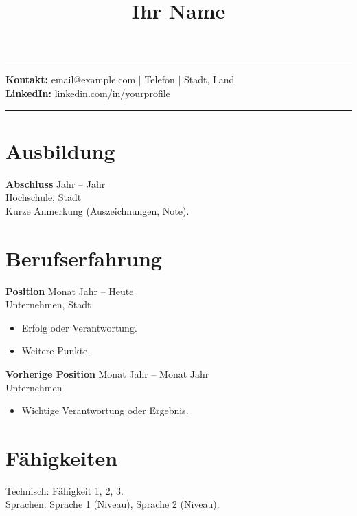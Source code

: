 \documentclass[11pt,a4paper]{article}
\title{\vspace{-1.2cm}\textbf{Ihr Name}}
\author{}
\date{}
\begin{document}
\maketitle
\vspace{-0.8cm}
\begin{flushright}\rule{2.2cm}{2.8cm}\end{flushright}

\textbf{Kontakt:} email@example.com \quad | \quad Telefon \quad | \quad Stadt, Land \\
\textbf{LinkedIn:} linkedin.com/in/yourprofile

\vspace{0.4cm}
\noindent\rule{\textwidth}{0.4pt}

\section*{Ausbildung}
\textbf{Abschluss} \hfill Jahr -- Jahr \\
Hochschule, Stadt \\
Kurze Anmerkung (Auszeichnungen, Note).

\section*{Berufserfahrung}
\textbf{Position} \hfill Monat Jahr -- Heute \\
Unternehmen, Stadt \\
\begin{itemize}
  \item Erfolg oder Verantwortung.
  \item Weitere Punkte.
\end{itemize}

\textbf{Vorherige Position} \hfill Monat Jahr -- Monat Jahr \\
Unternehmen \\
\begin{itemize}
  \item Wichtige Verantwortung oder Ergebnis.
\end{itemize}

\section*{Fähigkeiten}
Technisch: Fähigkeit 1, 2, 3. \\
Sprachen: Sprache 1 (Niveau), Sprache 2 (Niveau).
\end{document}
